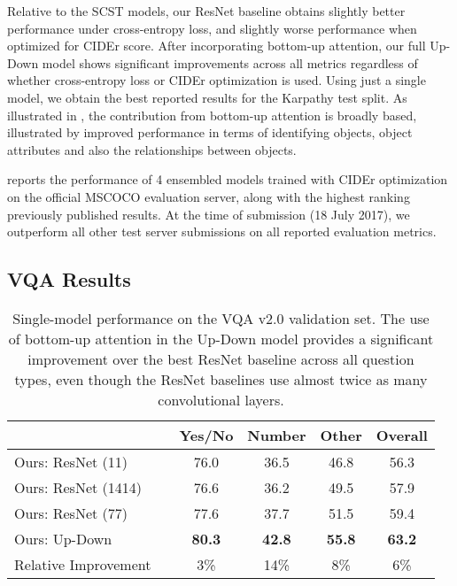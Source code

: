\documentclass[10pt,twocolumn,letterpaper]{article}
\begin{document}
Relative to the SCST models, our ResNet baseline obtains slightly better performance under cross-entropy loss, and slightly worse performance when optimized for CIDEr score. After incorporating bottom-up attention, our full Up-Down model shows significant improvements across all metrics regardless of whether cross-entropy loss or CIDEr optimization is used. Using just a single model, we obtain the best reported results for the Karpathy test split. As illustrated in , the contribution from bottom-up attention is broadly based, illustrated by improved performance in terms of identifying objects, object attributes and also the relationships between objects.

 reports the performance of 4 ensembled models trained with CIDEr optimization on the official MSCOCO evaluation server, along with the highest ranking previously published results. At the time of submission (18 July 2017), we outperform all other test server submissions on all reported evaluation metrics.




\subsection{VQA Results}

\begin{table}[t]
\small
\centering
\setlength{\tabcolsep}{.5em}
\begin{tabular}{llcccc}
\midrule
                                    &    &   Yes/No  &  Number   &  Other & Overall  \\
\midrule
Ours: ResNet (11) &    			 & 76.0	& 36.5	& 46.8 & 56.3	\\
Ours: ResNet (1414) &   				 & 76.6	& 36.2	& 49.5	& 57.9 \\
Ours: ResNet (77) &			 & 77.6	& 37.7	& 51.5 & 59.4	\\
Ours: Up-Down  &  & \textbf{80.3} & \textbf{42.8} & \textbf{55.8} & \textbf{63.2}\\
Relative Improvement &			 & 3\%	& 14\%	& 8\% & 6\%	\\
\midrule
\end{tabular}
\caption{Single-model performance on the VQA v2.0 validation set. The use of bottom-up attention in the Up-Down model provides a significant improvement over the best ResNet baseline across all question types, even though the ResNet baselines use almost twice as many convolutional layers.}
\label{tab:vqa_val}
\end{table}
\end{document}
